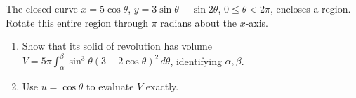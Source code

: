 The closed curve $x=5\cos\theta$, $y=3\sin\theta-\sin2\theta$, $0\le\theta<2\pi$, encloses a region. Rotate this entire region through $\pi$ radians about the $x$-axis.
\begin{enumerate}\item Show that its solid of revolution has volume $V=5\pi\int_\alpha^\beta\sin^3\theta(3-2\cos\theta)^2\,d\theta$, identifying $\alpha,\beta$.
\item Use $u=\cos\theta$ to evaluate $V$ exactly.\end{enumerate}
